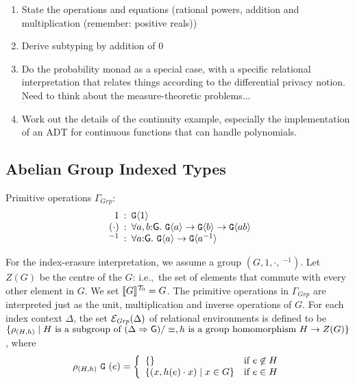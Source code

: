 \begin{enumerate}
\item State the operations and equations (rational powers, addition
  and multiplication (remember: positive reals))
\item Derive subtyping by addition of $0$
\item Do the probability monad as a special case, with a specific
  relational interpretation that relates things according to the
  differential privacy notion. Need to think about the
  measure-theoretic problems...
\item Work out the details of the continuity example, especially the
  implementation of an ADT for continuous functions that can handle
  polynomials.
\end{enumerate}

\subsection{Abelian Group Indexed Types}
\label{sec:abelian-group-indexed-types}

\newcommand{\Grp}{\mathit{Grp}}

Primitive operations $\Gamma_\Grp$:
\begin{displaymath}
  \begin{array}{r@{\hspace{0.5em}:\hspace{0.5em}}l}
    1 & \tyPrim{G}{1} \\
    (\cdot) & \forall a,b\mathord:\mathsf{G}.\ \tyPrim{G}{a} \to \tyPrim{G}{b} \to \tyPrim{G}{a b} \\
    \ ^{-1} & \forall a\mathord:\mathsf{G}.\ \tyPrim{G}{a} \to \tyPrim{G}{a^{-1}}
  \end{array}
\end{displaymath}

For the index-erasure interpretation, we assume a group $(G, 1, \cdot,
\ ^{-1})$. Let $Z(G)$ be the centre of the $G$: i.e.,~the set of
elements that commute with every other element in $G$. We set
$\llbracket G \rrbracket^{\mathcal{T}_0} = G$. The primitive operations in $\Gamma_\Grp$ are
interpreted just as the unit, multiplication and inverse operations
of $G$. For each index context $\Delta$, the set
$\relEnv{E}_\Grp(\Delta)$ of relational environments is defined to be
$\{ \rho_{(H,h)} \mathrel| H\textrm{ is a subgroup of }(\Delta
\Rightarrow \mathsf{G})/\equiv, h\textrm{ is a group homomorphism }H
\to Z(G) \}$, where
\begin{displaymath}
  \rho_{(H,h)}\ \tyPrimNm{G}\ (e) = \left\{
    \begin{array}{ll}
      \{ \} & \textrm{if}\ e\not\in H \\
      \{ (x, h(e)\cdot x) \sepbar x \in G \} & \textrm{if}\ e\in H
    \end{array}
  \right.
\end{displaymath}

